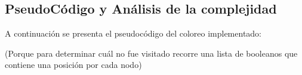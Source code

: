 


					
		
		


\subsection{PseudoCódigo y Análisis de la complejidad}

A continuación se presenta el pseudocódigo del coloreo implementado:

\begin{algorithmic} 
	 (Porque para determinar cuál no fue visitado recorre una lista de booleanos que contiene una posición por cada nodo)
		\ENDIF
	\ENDWHILE
\ENDWHILE
\end{algorithmic}


